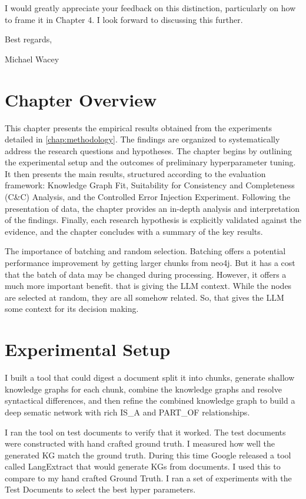I would greatly appreciate your feedback on this distinction, particularly on how to frame it in Chapter 4. I look forward to discussing this further.

Best regards,

Michael Wacey

\section{Chapter Overview}
\label{sec:results_overview}
This chapter presents the empirical results obtained from the experiments detailed in \cref{chap:methodology}. The findings are organized to systematically address the research questions and hypotheses. The chapter begins by outlining the experimental setup and the outcomes of preliminary hyperparameter tuning. It then presents the main results, structured according to the evaluation framework: Knowledge Graph Fit, Suitability for Consistency and Completeness (C\&C) Analysis, and the Controlled Error Injection Experiment. Following the presentation of data, the chapter provides an in-depth analysis and interpretation of the findings. Finally, each research hypothesis is explicitly validated against the evidence, and the chapter concludes with a summary of the key results.

The importance of batching and random selection. Batching offers a potential performance improvement by getting larger chunks from neo4j. But it has a cost that the batch of data may be changed during processing. However, it offers a much more important benefit. that is giving the LLM context. While the nodes are selected at random, they are all somehow related. So, that gives the LLM some context for its decision making.

\section{Experimental Setup}
\label{sec:exp_setup}
I built a tool that could digest a document split it into chunks, generate shallow knowledge graphs for each chunk, combine the knowledge graphs and resolve syntactical differences, and then refine the combined knowledge graph to build a deep sematic network with rich IS\_A and PART\_OF relationships.

I ran the tool on test documents to verify that it worked. The test documents were constructed with hand crafted ground truth. I measured how well the generated KG match the ground truth. During this time Google released a tool called LangExtract that would generate KGs from documents. I used this to compare to my hand crafted Ground Truth. I ran a set of experiments with the Test Documents to select the best hyper parameters.

